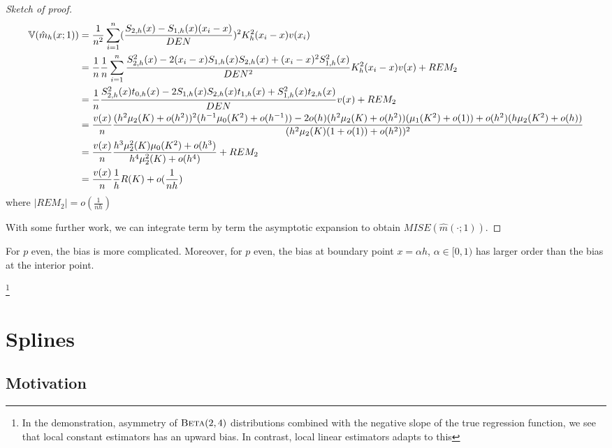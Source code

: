 \begin{proof}[Sketch of proof]
  \begin{align}
    \label{eq:63}
    \Var{\hat m_{h}(x; 1)} &= \frac{1}{n^{2}} \sum_{i=1}^{n}
    (\frac{S_{2, h}(x) - S_{1, h}(x)(x_{i} - x)}{DEN})^{2}
    K_{h}^{2}(x_{i} - x) v(x_{i}) \\
    &= \frac{1}{n} \frac{1}{n} \sum_{i=1}^{n} \frac{S_{2, h}^{2}(x) -
      2(x_{i} - x) S_{1, h}(x) S_{2, h}(x) + (x_{i} - x)^{2} S_{1,
        h}^{2}(x)}{DEN^{2}}  K^{2}_{h}(x_{i} - x) v(x) + REM_{2} \\
    &= \frac{1}{n} \frac{S_{2, h}^{2}(x) t_{0, h}(x) - 2 S_{1, h}(x)
      S_{2, h}(x) t_{1, h}(x) + S_{1, h}^{2}(x) t_{2, h}(x)}{DEN} v(x)
    + REM_{2} \\
    &= \frac{v(x)}{n} \frac{(h^{2} \mu_{2} (K) + o(h^{2}))^{2} (h^{-1}
      \mu_{0}(K^{2}) +o(h^{-1})) - 2 o(h) (h^{2} \mu_{2}(K) +
      o(h^{2}))(\mu_{1}(K^{2}) + o(1)) + o(h^{2}) (h \mu_{2} (K^{2}) +
      o(h))}{(h^{2} \mu_{2}(K)(1 + o(1)) + o(h^{2}))^{2}} \\
    &= \frac{v(x)}{n} \frac{h^{3} \mu_{2}^{2}(K) \mu_{0}(K^{2}) +
      o(h^{3})}{h^{4} \mu_{2}^{2}(K) + o(h^{4})} + REM_{2} \\
      &= \frac{v(x)}{n}  \frac{1}{h}  R(K) + o(\frac{1}{nh})
    \end{align} where $|REM_{2}| = o(\frac{1}{nh})$

    With some further work, we can integrate term by term the
    asymptotic expansion to obtain $MISE(\hat m(\cdot; 1))$.
\end{proof}

For $p$ even, the bias is more complicated.  Moreover, for $p$ even,
the bias at boundary point $x = \alpha h$, $\alpha \in [0, 1)$ has
larger order than the bias at the interior point.


\footnote{In the demonstration, asymmetry of $\textsc{Beta}(2, 4)$ distributions
combined with the negative slope of the true regression function, we
see that local constant estimators has an upward bias.  In contrast,
local linear estimators adapts to this}

\section{Splines}
\label{sec:splines}

\subsection{Motivation}
\label{sec:motivation}


